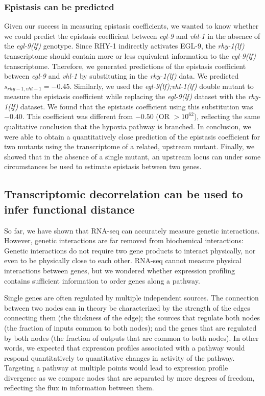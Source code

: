 \documentclass[10pt, onecolumn]{article}
\newcommand{\gene}[1]{\emph{#1}}
\newcommand{\egl}{\emph{\mbox{egl-9}(lf)}}
\newcommand{\rhy}{\emph{\mbox{rhy-1}(lf)}}
\newcommand{\eglvhl}{\emph{\mbox{egl-9(lf);vhl-1(lf)}}}
\newcommand{\eglp}{EGL-9}
\newcommand{\rhyp}{RHY-1}
\begin{document}
\subsubsection*{Epistasis can be predicted}
Given our success in measuring epistasis coefficients, we wanted to know whether
we could predict the epistasis coefficient between \gene{egl-9} and \gene{vhl-1}
in the absence of the \egl{} genotype. Since \rhyp{} indirectly activates
\eglp{}, the \rhy{} transcriptome should contain more or less
equivalent information to the \egl{} transcriptome. Therefore, we generated
predictions of the epistasis coefficient between \gene{egl-9} and \gene{vhl-1}
by substituting in the \rhy{} data. We predicted $s_{rhy-1,vhl-1} = -0.45$.
Similarly, we used the \eglvhl{} double mutant to
measure the epistasis coefficient while replacing the \egl{} dataset with the \rhy{}
dataset. We found that the epistasis coefficient using this substitution was $-0.40$.
This coefficient was different from $-0.50$ (OR $>10^{62}$), reflecting the same
qualitative conclusion that the hypoxia pathway is branched.
In conclusion, we were able to obtain a quantitatively close prediction of the
epistasis coefficient for two mutants using the transcriptome of a related,
upstream mutant. Finally, we showed that in the absence of a single mutant, an
upstream locus can under some circumstances be used to estimate epistasis
between two genes.


\subsection*{Transcriptomic decorrelation can be used to infer functional distance}
\label{sub:decorrelation}
So far, we have shown that RNA-seq can accurately measure genetic interactions.
However, genetic interactions are far removed from biochemical interactions:
Genetic interactions do not require two gene products to interact physically, nor
even to be physically close to each other. RNA-seq cannot measure physical
interactions between genes, but we wondered whether expression profiling contains
sufficient information to order genes along a pathway.

Single
genes are often regulated by multiple independent sources. The connection between
two nodes can in theory be characterized by the strength of the edges connecting
them (the thickness of the edge); the sources that regulate both
nodes (the fraction of inputs common to both nodes); and the genes that are
regulated by both nodes (the fraction of outputs that are common to both nodes).
In other words, we expected that expression profiles associated with a pathway
would respond quantitatively to quantitative changes in activity of the pathway.
Targeting a pathway at multiple points would lead to expression profile
divergence as we compare nodes that are separated by more degrees of freedom,
reflecting the flux in information between them.
\end{document}
